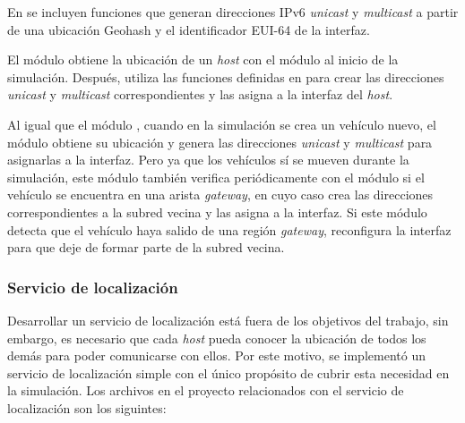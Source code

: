 
En  se incluyen funciones que generan direcciones
IPv6 \textit{unicast} y \textit{multicast} a partir de una ubicación Geohash y
el identificador EUI-64 de la interfaz.

El módulo  obtiene la ubicación de un
\textit{host} con el módulo  al inicio de la
simulación. Después, utiliza las funciones definidas en
 para crear las direcciones \textit{unicast} y
\textit{multicast} correspondientes y las asigna a la interfaz
del \textit{host}.

Al igual que el módulo , cuando en la simulación
se crea un vehículo nuevo, el módulo  obtiene su
ubicación y genera las direcciones \textit{unicast} y \textit{multicast} para
asignarlas a la interfaz. Pero ya que los vehículos sí se mueven durante la
simulación, este módulo también verifica periódicamente con el módulo
 si el vehículo se encuentra en una arista \textit{gateway},
en cuyo caso crea las direcciones correspondientes a la subred vecina y las
asigna a la interfaz. Si este módulo detecta que el vehículo haya salido de una
región \textit{gateway}, reconfigura la interfaz para que deje de formar parte
de la subred vecina.


\subsubsection{Servicio de localización}

\label{subsubsec:servicio_de_localizacion_sim}

Desarrollar un servicio de localización está fuera de los objetivos del
trabajo, sin embargo, es necesario que cada \textit{host} pueda conocer la
ubicación de todos los demás para poder comunicarse con ellos. Por este motivo,
se implementó un servicio de localización simple con el único propósito de
cubrir esta necesidad en la simulación. Los archivos en el proyecto
relacionados con el servicio de localización son los siguintes:
\newpage

